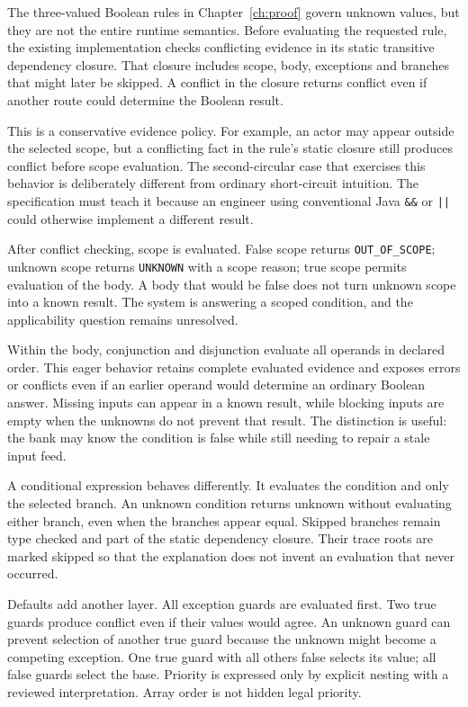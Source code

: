 The three-valued Boolean rules in Chapter~\ref{ch:proof} govern unknown values,
but they are not the entire runtime semantics. Before evaluating the requested
rule, the existing implementation checks conflicting evidence in its static
transitive dependency closure. That closure includes scope, body, exceptions and
branches that might later be skipped. A conflict in the closure returns conflict
even if another route could determine the Boolean result.

This is a conservative evidence policy. For example, an actor may appear outside
the selected scope, but a conflicting fact in the rule's static closure still
produces conflict before scope evaluation. The second-circular case that exercises
this behavior is deliberately different from ordinary short-circuit intuition.
The specification must teach it because an engineer using conventional Java
\texttt{\&\&} or \texttt{||} could otherwise implement a different result.

After conflict checking, scope is evaluated. False scope returns
\texttt{OUT\_OF\_SCOPE}; unknown scope returns \texttt{UNKNOWN} with a scope reason;
true scope permits evaluation of the body. A body that would be false does not
turn unknown scope into a known result. The system is answering a scoped
condition, and the applicability question remains unresolved.


Within the body, conjunction and disjunction evaluate all operands in declared
order. This eager behavior retains complete evaluated evidence and exposes errors
or conflicts even if an earlier operand would determine an ordinary Boolean
answer. Missing inputs can appear in a known result, while blocking inputs are
empty when the unknowns do not prevent that result. The distinction is useful:
the bank may know the condition is false while still needing to repair a stale
input feed.

A conditional expression behaves differently. It evaluates the condition and
only the selected branch. An unknown condition returns unknown without evaluating
either branch, even when the branches appear equal. Skipped branches remain type
checked and part of the static dependency closure. Their trace roots are marked
skipped so that the explanation does not invent an evaluation that never occurred.

Defaults add another layer. All exception guards are evaluated first. Two true
guards produce conflict even if their values would agree. An unknown guard can
prevent selection of another true guard because the unknown might become a
competing exception. One true guard with all others false selects its value; all
false guards select the base. Priority is expressed only by explicit nesting with
a reviewed interpretation. Array order is not hidden legal priority.

